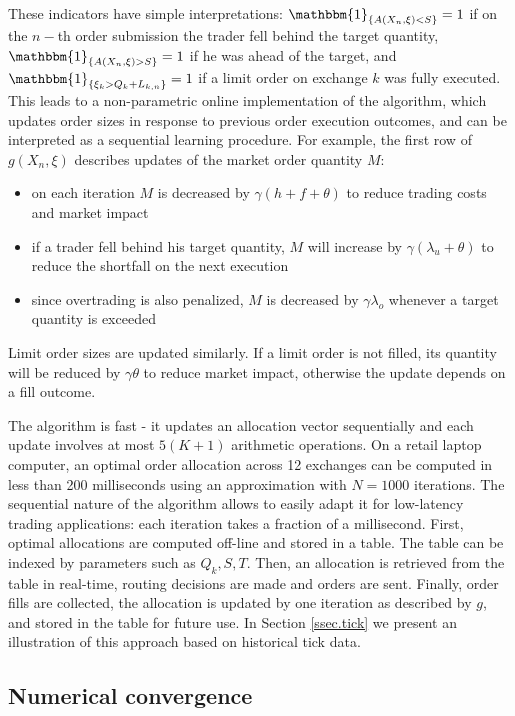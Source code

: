 \documentclass[opre,nonblindrev]{informs3}
\newcommand{\indicator}[1]{\mathbbm{1}_{\left\{ {#1} \right\} }}
\begin{document}
These indicators have simple interpretations: $\indicator{A(X_n,\xi)<S}=1$ if on the $n-$th order submission the trader fell behind the target quantity, $\indicator{A(X_n,\xi)>S}=1$ if he was ahead of the target, and $\indicator{\xi_k>Q_k+L_{k,n}}=1$ if a limit order on exchange $k$ was fully executed. This leads to a non-parametric online implementation of the algorithm, which updates order sizes in response to previous order execution outcomes, and can be interpreted as a sequential learning procedure. For example, the first row of  $g(X_n,\xi)$ describes updates of the market order quantity $M$:
\begin{itemize}
\item on each iteration $M$ is decreased by $\gamma(h + f+\theta)$ to reduce trading costs and market impact
\item if a trader fell behind his target quantity, $M$ will increase by $\gamma(\lambda_u+\theta)$ to reduce the shortfall on the next execution
\item since overtrading is also penalized, $M$ is decreased by $\gamma\lambda_o$ whenever a target quantity is exceeded
\end{itemize}
\noindent Limit order sizes are updated similarly. If a limit order is not filled, its quantity will be reduced by $\gamma\theta$ to reduce market impact, otherwise the update depends on a fill outcome.

The algorithm is fast - it updates an allocation vector sequentially and each update involves at most $5(K+1)$ arithmetic operations. On a retail laptop computer, an optimal order allocation across 12 exchanges can be computed in less than 200 milliseconds using an approximation with $N=1000$ iterations. The sequential nature of the algorithm allows to easily adapt it for low-latency trading applications: each iteration takes a fraction of a millisecond. First, optimal allocations are computed off-line and stored in a table. The table can be indexed by parameters such as $Q_k, S, T$. Then, an allocation is retrieved from the table in real-time, routing decisions are made and orders are sent. Finally, order fills are collected, the allocation is updated by one iteration as described by $g$, and stored in the table for future use. In Section \ref{ssec.tick} we present an illustration of this approach based on historical tick data.

\subsection{Numerical convergence}
\end{document}
